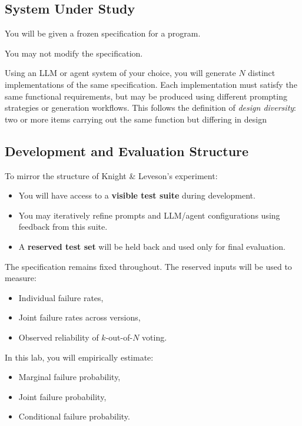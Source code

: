 \documentclass[manuscript,screen,nonacm]{acmart}
\begin{document}
\subsection{System Under Study}

You will be given a frozen specification for a program.

You may not modify the specification.

Using an LLM or agent system of your choice, you will generate $N$ distinct implementations of the same specification.
Each implementation must satisfy the same functional requirements, but may be produced using different prompting strategies or generation workflows.
This follows the definition of \emph{design diversity}: two or more items carrying out the same function but differing in design  

\subsection{Development and Evaluation Structure}

To mirror the structure of Knight \& Leveson’s experiment:

\begin{itemize}
  \item You will have access to a \textbf{visible test suite} during development.
  \item You may iteratively refine prompts and LLM/agent configurations using feedback from this suite.
  \item A \textbf{reserved test set} will be held back and used only for final evaluation.
\end{itemize}

The specification remains fixed throughout.
The reserved inputs will be used to measure:
\begin{itemize}
  \item Individual failure rates,
  \item Joint failure rates across versions,
  \item Observed reliability of $k$-out-of-$N$ voting.
\end{itemize}


In this lab, you will empirically estimate:

\begin{itemize}
  \item Marginal failure probability,
  \item Joint failure probability,
  \item Conditional failure probability.
\end{itemize}
\end{document}
